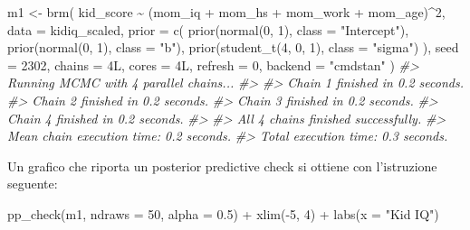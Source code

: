\documentclass[
  10pt,
  italian,
  a4paper,
  extrafontsizes,onecolumn,openright
  ]{memoir}
\newenvironment{Shaded}{\begin{snugshade}}{\end{snugshade}}
\newcommand{\AttributeTok}[1]{\textcolor[rgb]{0.77,0.63,0.00}{#1}}
\newcommand{\CommentTok}[1]{\textcolor[rgb]{0.56,0.35,0.01}{\textit{#1}}}
\newcommand{\DecValTok}[1]{\textcolor[rgb]{0.00,0.00,0.81}{#1}}
\newcommand{\FloatTok}[1]{\textcolor[rgb]{0.00,0.00,0.81}{#1}}
\newcommand{\FunctionTok}[1]{\textcolor[rgb]{0.00,0.00,0.00}{#1}}
\newcommand{\NormalTok}[1]{#1}
\newcommand{\OtherTok}[1]{\textcolor[rgb]{0.56,0.35,0.01}{#1}}
\newcommand{\SpecialCharTok}[1]{\textcolor[rgb]{0.00,0.00,0.00}{#1}}
\newcommand{\StringTok}[1]{\textcolor[rgb]{0.31,0.60,0.02}{#1}}
\theoremstyle{definition}
\theoremstyle{definition}
\theoremstyle{definition}
\theoremstyle{definition}
\theoremstyle{remark}
\begin{document}
\begin{Shaded}
\begin{Highlighting}[]
\NormalTok{m1 }\OtherTok{\textless{}{-}} \FunctionTok{brm}\NormalTok{(}
\NormalTok{  kid\_score }\SpecialCharTok{\textasciitilde{}}\NormalTok{ (mom\_iq }\SpecialCharTok{+}\NormalTok{ mom\_hs }\SpecialCharTok{+}\NormalTok{ mom\_work }\SpecialCharTok{+}\NormalTok{ mom\_age)}\SpecialCharTok{\^{}}\DecValTok{2}\NormalTok{,}
  \AttributeTok{data =}\NormalTok{ kidiq\_scaled,}
  \AttributeTok{prior =} \FunctionTok{c}\NormalTok{(}
    \FunctionTok{prior}\NormalTok{(}\FunctionTok{normal}\NormalTok{(}\DecValTok{0}\NormalTok{, }\DecValTok{1}\NormalTok{), }\AttributeTok{class =} \StringTok{"Intercept"}\NormalTok{),}
    \FunctionTok{prior}\NormalTok{(}\FunctionTok{normal}\NormalTok{(}\DecValTok{0}\NormalTok{, }\DecValTok{1}\NormalTok{), }\AttributeTok{class =} \StringTok{"b"}\NormalTok{),}
    \FunctionTok{prior}\NormalTok{(}\FunctionTok{student\_t}\NormalTok{(}\DecValTok{4}\NormalTok{, }\DecValTok{0}\NormalTok{, }\DecValTok{1}\NormalTok{), }\AttributeTok{class =} \StringTok{"sigma"}\NormalTok{)}
\NormalTok{  ),}
  \AttributeTok{seed =} \DecValTok{2302}\NormalTok{,}
  \AttributeTok{chains =}\NormalTok{ 4L,}
  \AttributeTok{cores =}\NormalTok{ 4L,}
  \AttributeTok{refresh =} \DecValTok{0}\NormalTok{,}
  \AttributeTok{backend =} \StringTok{"cmdstan"}
\NormalTok{)}
\CommentTok{\#\textgreater{} Running MCMC with 4 parallel chains...}
\CommentTok{\#\textgreater{} }
\CommentTok{\#\textgreater{} Chain 1 finished in 0.2 seconds.}
\CommentTok{\#\textgreater{} Chain 2 finished in 0.2 seconds.}
\CommentTok{\#\textgreater{} Chain 3 finished in 0.2 seconds.}
\CommentTok{\#\textgreater{} Chain 4 finished in 0.2 seconds.}
\CommentTok{\#\textgreater{} }
\CommentTok{\#\textgreater{} All 4 chains finished successfully.}
\CommentTok{\#\textgreater{} Mean chain execution time: 0.2 seconds.}
\CommentTok{\#\textgreater{} Total execution time: 0.3 seconds.}
\end{Highlighting}
\end{Shaded}

\noindent
Un grafico che riporta un posterior predictive check si ottiene con l'istruzione seguente:

\begin{Shaded}
\begin{Highlighting}[]
\FunctionTok{pp\_check}\NormalTok{(m1, }\AttributeTok{ndraws =} \DecValTok{50}\NormalTok{, }\AttributeTok{alpha =} \FloatTok{0.5}\NormalTok{) }\SpecialCharTok{+}
  \FunctionTok{xlim}\NormalTok{(}\SpecialCharTok{{-}}\DecValTok{5}\NormalTok{, }\DecValTok{4}\NormalTok{) }\SpecialCharTok{+}
  \FunctionTok{labs}\NormalTok{(}\AttributeTok{x =} \StringTok{"Kid IQ"}\NormalTok{)}
\end{Highlighting}
\end{Shaded}
\end{document}
